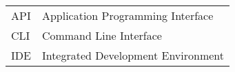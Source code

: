 \begin{longtable}{p{3cm}p{10cm}}
    API&Application Programming Interface\\
    CLI&Command Line Interface\\
    IDE&Integrated Development Environment\\
\end{longtable}
\addtocounter{table}{-1}
